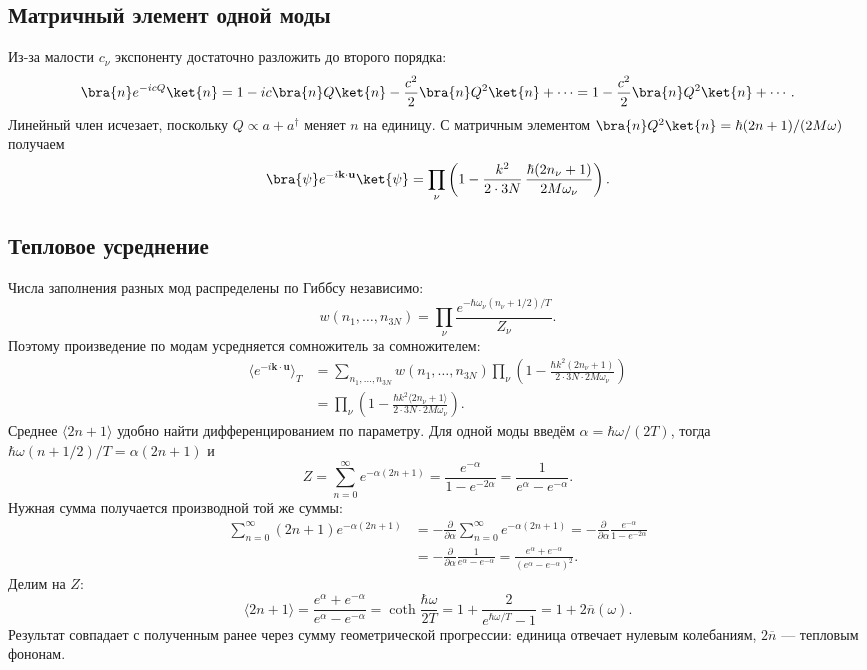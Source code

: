 \documentclass[../final.tex]{subfiles}
\begin{document}
\subsection{Матричный элемент одной моды}
Из-за малости $c_\nu$ экспоненту достаточно разложить до второго порядка:
\begin{equation*}
 \bra{n}e^{-icQ}\ket{n}
 =1-ic\bra{n}Q\ket{n}-\frac{c^2}{2}\bra{n}Q^2\ket{n}+\cdots
 =1-\frac{c^2}{2}\bra{n}Q^2\ket{n}+\cdots .
\end{equation*}
Линейный член исчезает, поскольку $Q\propto a+a^\dagger$ меняет $n$ на единицу.
С матричным элементом $\bra{n}Q^2\ket{n}=\hbar(2n+1)/(2M\omega)$ получаем
\begin{equation*}
 \bra{\psi}e^{-i\mathbf k\cdot\mathbf u}\ket{\psi}
 =\prod_\nu\left(1-\frac{k^2}{2\cdot3N}\,
 \frac{\hbar(2n_\nu+1)}{2M\omega_\nu}\right).
\end{equation*}

\clearpage
\subsection{Тепловое усреднение}
Числа заполнения разных мод распределены по Гиббсу независимо:
\begin{equation*}
 w(n_1,\ldots,n_{3N})=\prod_\nu
 \frac{e^{-\hbar\omega_\nu(n_\nu+1/2)/T}}{Z_\nu}.
\end{equation*}
Поэтому произведение по модам усредняется сомножитель за сомножителем:
\begin{align*}
 \langle e^{-i\mathbf k\cdot\mathbf u}\rangle_T
 &=\sum_{n_1,\ldots,n_{3N}}w(n_1,\ldots,n_{3N})
 \prod_\nu\left(1-\frac{\hbar k^2(2n_\nu+1)}{2\cdot3N\cdot2M\omega_\nu}\right)\\
 &=\prod_\nu\left(1-\frac{\hbar k^2\langle2n_\nu+1\rangle}
 {2\cdot3N\cdot2M\omega_\nu}\right).
\end{align*}
Среднее $\langle2n+1\rangle$ удобно найти дифференцированием по параметру.
Для одной моды введём $\alpha=\hbar\omega/(2T)$, тогда
$\hbar\omega(n+1/2)/T=\alpha(2n+1)$ и
\begin{equation*}
 Z=\sum_{n=0}^{\infty}e^{-\alpha(2n+1)}
 =\frac{e^{-\alpha}}{1-e^{-2\alpha}}
 =\frac1{e^{\alpha}-e^{-\alpha}}.
\end{equation*}
Нужная сумма получается производной той же суммы:
\begin{align*}
 \sum_{n=0}^{\infty}(2n+1)e^{-\alpha(2n+1)}
 &=-\frac{\partial}{\partial\alpha}\sum_{n=0}^{\infty}e^{-\alpha(2n+1)}
 =-\frac{\partial}{\partial\alpha}\frac{e^{-\alpha}}{1-e^{-2\alpha}}\\
 &=-\frac{\partial}{\partial\alpha}\frac1{e^{\alpha}-e^{-\alpha}}
 =\frac{e^{\alpha}+e^{-\alpha}}{(e^{\alpha}-e^{-\alpha})^2}.
\end{align*}
Делим на $Z$:
\begin{equation*}
 \langle2n+1\rangle
 =\frac{e^{\alpha}+e^{-\alpha}}{e^{\alpha}-e^{-\alpha}}
 =\coth\frac{\hbar\omega}{2T}
 =1+\frac{2}{e^{\hbar\omega/T}-1}
 =1+2\overline n(\omega).
\end{equation*}
Результат совпадает с полученным ранее через сумму геометрической
прогрессии: единица отвечает нулевым колебаниям, $2\overline n$ --- тепловым фононам.
\end{document}
